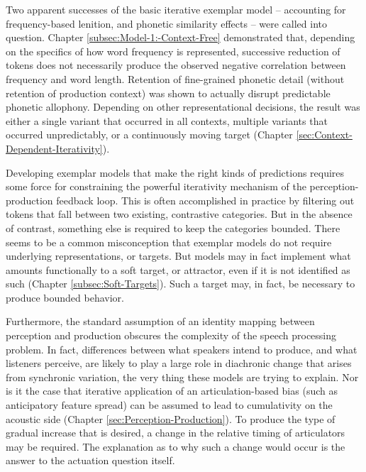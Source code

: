 Two apparent successes of the basic iterative exemplar model – accounting
for frequency-based lenition, and phonetic similarity effects – were
called into question. Chapter \ref{subsec:Model-1:-Context-Free}
demonstrated that, depending on the specifics of how word frequency
is represented, successive reduction of tokens does not necessarily
produce the observed negative correlation between frequency and word
length. Retention of fine-grained phonetic detail (without retention
of production context) was shown to actually disrupt predictable phonetic
allophony. Depending on other representational decisions, the result
was either a single variant that occurred in all contexts, multiple
variants that occurred unpredictably, or a continuously moving target
(Chapter \ref{sec:Context-Dependent-Iterativity}). 

Developing exemplar models that make the right kinds of predictions
requires some force for constraining the powerful iterativity mechanism
of the perception-production feedback loop. This is often accomplished
in practice by filtering out tokens that fall between two existing,
contrastive categories. But in the absence of contrast, something
else is required to keep the categories bounded. There seems to be
a common misconception that exemplar models do not require underlying
representations, or targets. But models may in fact implement what
amounts functionally to a soft target, or attractor, even if it is
not identified as such (Chapter \ref{subsec:Soft-Targets}). Such
a target may, in fact, be necessary to produce bounded behavior.

Furthermore, the standard assumption of an identity mapping between
perception and production obscures the complexity of the speech processing
problem. In fact, differences between what speakers intend to produce,
and what listeners perceive, are likely to play a large role in diachronic
change that arises from synchronic variation, the very thing these
models are trying to explain. Nor is it the case that iterative application
of an articulation-based bias (such as anticipatory feature spread)
can be assumed to lead to cumulativity on the acoustic side (Chapter
\ref{sec:Perception-Production}). To produce the type of gradual
increase that is desired, a change in the relative timing of articulators
may be required. The explanation as to why such a change would occur
is the answer to the actuation question itself.

